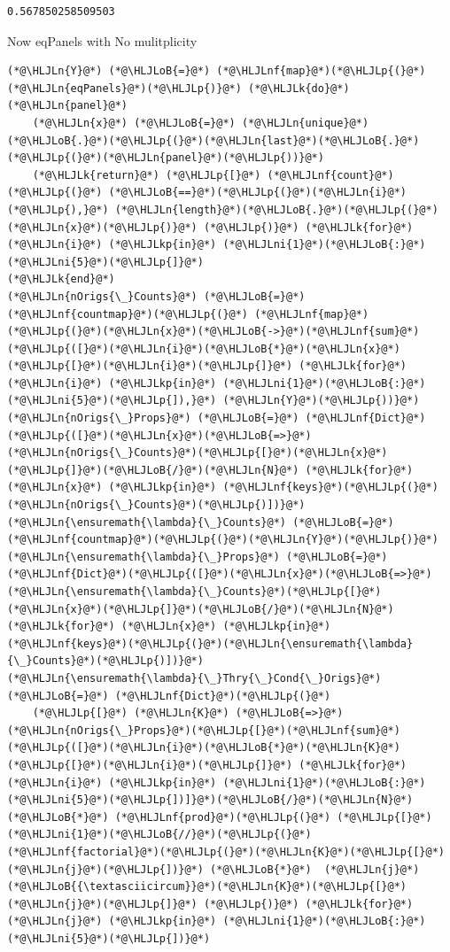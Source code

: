 \documentclass[12pt,a4paper]{article}
\newcommand{\HLJLk}[1]{\textcolor[RGB]{148,91,176}{\textbf{#1}}}
\newcommand{\HLJLkp}[1]{\textcolor[RGB]{148,91,176}{\textbf{#1}}}
\newcommand{\HLJLn}[1]{#1}
\newcommand{\HLJLnf}[1]{\textcolor[RGB]{66,102,213}{#1}}
\newcommand{\HLJLni}[1]{\textcolor[RGB]{59,151,46}{#1}}
\newcommand{\HLJLoB}[1]{\textcolor[RGB]{102,102,102}{\textbf{#1}}}
\newcommand{\HLJLp}[1]{#1}
\begin{document}
\begin{lstlisting}
0.567850258509503
\end{lstlisting}


Now eqPanels with No mulitplicity


\begin{lstlisting}
(*@\HLJLn{Y}@*) (*@\HLJLoB{=}@*) (*@\HLJLnf{map}@*)(*@\HLJLp{(}@*)(*@\HLJLn{eqPanels}@*)(*@\HLJLp{)}@*) (*@\HLJLk{do}@*) (*@\HLJLn{panel}@*)
	(*@\HLJLn{x}@*) (*@\HLJLoB{=}@*) (*@\HLJLn{unique}@*)(*@\HLJLoB{.}@*)(*@\HLJLp{(}@*)(*@\HLJLn{last}@*)(*@\HLJLoB{.}@*)(*@\HLJLp{(}@*)(*@\HLJLn{panel}@*)(*@\HLJLp{))}@*)
	(*@\HLJLk{return}@*) (*@\HLJLp{[}@*) (*@\HLJLnf{count}@*)(*@\HLJLp{(}@*) (*@\HLJLoB{==}@*)(*@\HLJLp{(}@*)(*@\HLJLn{i}@*)(*@\HLJLp{),}@*) (*@\HLJLn{length}@*)(*@\HLJLoB{.}@*)(*@\HLJLp{(}@*)(*@\HLJLn{x}@*)(*@\HLJLp{)}@*) (*@\HLJLp{)}@*) (*@\HLJLk{for}@*) (*@\HLJLn{i}@*) (*@\HLJLkp{in}@*) (*@\HLJLni{1}@*)(*@\HLJLoB{:}@*)(*@\HLJLni{5}@*)(*@\HLJLp{]}@*)
(*@\HLJLk{end}@*)
(*@\HLJLn{nOrigs{\_}Counts}@*) (*@\HLJLoB{=}@*) (*@\HLJLnf{countmap}@*)(*@\HLJLp{(}@*) (*@\HLJLnf{map}@*)(*@\HLJLp{(}@*)(*@\HLJLn{x}@*)(*@\HLJLoB{->}@*)(*@\HLJLnf{sum}@*)(*@\HLJLp{([}@*)(*@\HLJLn{i}@*)(*@\HLJLoB{*}@*)(*@\HLJLn{x}@*)(*@\HLJLp{[}@*)(*@\HLJLn{i}@*)(*@\HLJLp{]}@*) (*@\HLJLk{for}@*) (*@\HLJLn{i}@*) (*@\HLJLkp{in}@*) (*@\HLJLni{1}@*)(*@\HLJLoB{:}@*)(*@\HLJLni{5}@*)(*@\HLJLp{]),}@*) (*@\HLJLn{Y}@*)(*@\HLJLp{))}@*)
(*@\HLJLn{nOrigs{\_}Props}@*) (*@\HLJLoB{=}@*) (*@\HLJLnf{Dict}@*)(*@\HLJLp{([}@*)(*@\HLJLn{x}@*)(*@\HLJLoB{=>}@*)(*@\HLJLn{nOrigs{\_}Counts}@*)(*@\HLJLp{[}@*)(*@\HLJLn{x}@*)(*@\HLJLp{]}@*)(*@\HLJLoB{/}@*)(*@\HLJLn{N}@*) (*@\HLJLk{for}@*) (*@\HLJLn{x}@*) (*@\HLJLkp{in}@*) (*@\HLJLnf{keys}@*)(*@\HLJLp{(}@*)(*@\HLJLn{nOrigs{\_}Counts}@*)(*@\HLJLp{)])}@*)
(*@\HLJLn{\ensuremath{\lambda}{\_}Counts}@*) (*@\HLJLoB{=}@*) (*@\HLJLnf{countmap}@*)(*@\HLJLp{(}@*)(*@\HLJLn{Y}@*)(*@\HLJLp{)}@*)
(*@\HLJLn{\ensuremath{\lambda}{\_}Props}@*) (*@\HLJLoB{=}@*) (*@\HLJLnf{Dict}@*)(*@\HLJLp{([}@*)(*@\HLJLn{x}@*)(*@\HLJLoB{=>}@*)(*@\HLJLn{\ensuremath{\lambda}{\_}Counts}@*)(*@\HLJLp{[}@*)(*@\HLJLn{x}@*)(*@\HLJLp{]}@*)(*@\HLJLoB{/}@*)(*@\HLJLn{N}@*) (*@\HLJLk{for}@*) (*@\HLJLn{x}@*) (*@\HLJLkp{in}@*) (*@\HLJLnf{keys}@*)(*@\HLJLp{(}@*)(*@\HLJLn{\ensuremath{\lambda}{\_}Counts}@*)(*@\HLJLp{)])}@*)
(*@\HLJLn{\ensuremath{\lambda}{\_}Thry{\_}Cond{\_}Origs}@*) (*@\HLJLoB{=}@*) (*@\HLJLnf{Dict}@*)(*@\HLJLp{(}@*)
	(*@\HLJLp{[}@*) (*@\HLJLn{K}@*) (*@\HLJLoB{=>}@*) (*@\HLJLn{nOrigs{\_}Props}@*)(*@\HLJLp{[}@*)(*@\HLJLnf{sum}@*)(*@\HLJLp{([}@*)(*@\HLJLn{i}@*)(*@\HLJLoB{*}@*)(*@\HLJLn{K}@*)(*@\HLJLp{[}@*)(*@\HLJLn{i}@*)(*@\HLJLp{]}@*) (*@\HLJLk{for}@*) (*@\HLJLn{i}@*) (*@\HLJLkp{in}@*) (*@\HLJLni{1}@*)(*@\HLJLoB{:}@*)(*@\HLJLni{5}@*)(*@\HLJLp{])]}@*)(*@\HLJLoB{/}@*)(*@\HLJLn{N}@*) (*@\HLJLoB{*}@*) (*@\HLJLnf{prod}@*)(*@\HLJLp{(}@*) (*@\HLJLp{[}@*) (*@\HLJLni{1}@*)(*@\HLJLoB{//}@*)(*@\HLJLp{(}@*) (*@\HLJLnf{factorial}@*)(*@\HLJLp{(}@*)(*@\HLJLn{K}@*)(*@\HLJLp{[}@*)(*@\HLJLn{j}@*)(*@\HLJLp{])}@*) (*@\HLJLoB{*}@*)  (*@\HLJLn{j}@*)(*@\HLJLoB{{\textasciicircum}}@*)(*@\HLJLn{K}@*)(*@\HLJLp{[}@*)(*@\HLJLn{j}@*)(*@\HLJLp{]}@*) (*@\HLJLp{)}@*) (*@\HLJLk{for}@*) (*@\HLJLn{j}@*) (*@\HLJLkp{in}@*) (*@\HLJLni{1}@*)(*@\HLJLoB{:}@*)(*@\HLJLni{5}@*)(*@\HLJLp{])}@*) 

\end{lstlisting}
\end{document}

